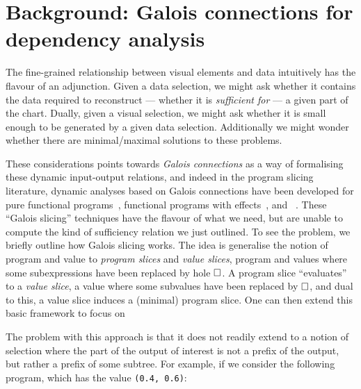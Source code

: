 \section{Background: Galois connections for dependency analysis}
\label{sec:background}



The fine-grained relationship between visual elements and data intuitively has the flavour of an adjunction. Given a data selection, we might ask whether it contains the data required to reconstruct --- whether it is \emph{sufficient for} --- a given part of the chart. Dually, given a visual selection, we might ask whether it is small enough to be generated by a given data selection. Additionally we might wonder whether there are minimal/maximal solutions to these problems.

These considerations points towards \emph{Galois connections} as a way of formalising these dynamic input-output relations, and indeed in the program slicing literature, dynamic analyses based on Galois connections have been developed for pure functional programs~\cite{perera12a}, functional programs with effects~\cite{ricciotti17}, and \piCalculus~\cite{perera16d}. These ``Galois slicing'' techniques have the flavour of what we need, but are unable to compute the kind of sufficiency relation we just outlined. To see the problem, we briefly outline how Galois slicing works. The idea is generalise the notion of program and value to \emph{program slices} and \emph{value slices}, program and values where some subexpressions have been replaced by hole $\square$. A program slice ``evaluates'' to a \emph{value slice}, a value where some subvalues have been replaced by $\square$, and dual to this, a value slice induces a (minimal) program slice. One can then extend this basic framework to focus on

The problem with this approach is that it does not readily extend to a notion of selection where the part of the output of interest is not a prefix of the output, but rather a prefix of some subtree. For example, if we consider the following program, which has the value \lstinline{(0.4, 0.6)}:

